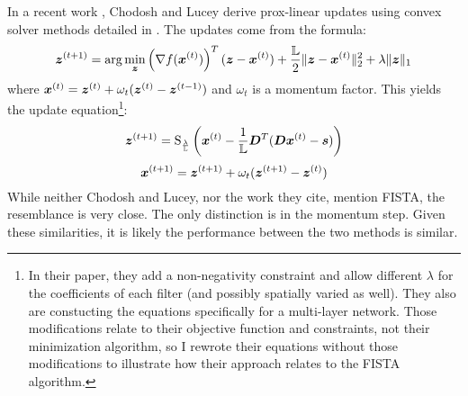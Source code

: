 In a recent work \cite{chodosh2020use}, Chodosh and Lucey derive prox-linear updates using convex solver methods detailed in \cite{xu2013block}. The updates come from the formula:
\begin{equation}
\bm{z}^{(t + 1)} = \arg\min_{\bm{z}} \left(\nabla f(\bm{x}^{(t)})\right)^T(\bm{z} - \bm{x}^{(t)}) + \frac{\mathbb{L}}{2}\|\bm{z} - \bm{x}^{(t)}\|_2^2 + \lambda\|\bm{z}\|_1
\end{equation}
%
where $\bm{x}^{(t)} = \bm{z}^{(t)} + \omega_t(\bm{z}^{(t)} - \bm{z}^{(t - 1)})$ and $\omega_t$ is a momentum factor. This yields the update equation\footnote{In their paper, they add a non-negativity constraint and allow different $\lambda$ for the coefficients of each filter (and possibly spatially varied as well). They also are constucting the equations specifically for a multi-layer network. Those modifications relate to their objective function and constraints, not their minimization algorithm, so I rewrote their equations without those modifications to illustrate how their approach relates to the FISTA algorithm.}:
\begin{equation}
\bm{z}^{(t + 1)} = \operatorname{S}_{\frac{\lambda}{\mathbb{L}}}\left(\bm{x}^{(t)} - \frac{1}{\mathbb{L}}\bm{D}^T(\bm{D}\bm{x}^{(t)} - \bm{s})\right)
\end{equation}
%
\begin{equation}
\bm{x}^{(t + 1)} = \bm{z}^{(t + 1)} + \omega_t(\bm{z}^{(t + 1)} - \bm{z}^{(t)})
\end{equation}
%
While neither Chodosh and Lucey, nor the work they cite, mention FISTA, the resemblance is very close. The only distinction is in the momentum step.  Given these similarities, it is likely the performance between the two methods is similar.

